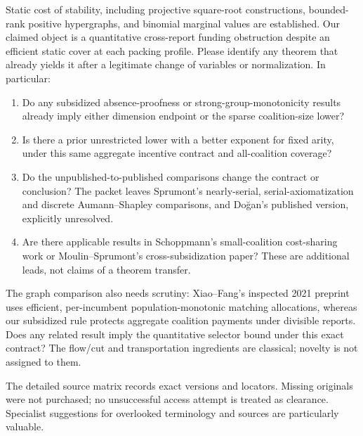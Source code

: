 \documentclass[11pt]{article}
\begin{document}
Static cost of stability, including projective square-root constructions,
bounded-rank positive hypergraphs, and binomial marginal values are established.
Our claimed object is a quantitative cross-report funding obstruction despite
an efficient static cover at each packing profile. Please identify any theorem
that already yields it after a legitimate change of variables or normalization.
In particular:
\begin{enumerate}
\item Do any subsidized absence-proofness or strong-group-monotonicity results
already imply either dimension endpoint or the sparse coalition-size lower?
\item Is there a prior unrestricted lower with a better exponent for fixed
arity, under this same aggregate incentive contract and all-coalition coverage?
\item Do the unpublished-to-published comparisons change the contract or
conclusion? The packet leaves Sprumont's nearly-serial, serial-axiomatization
and discrete Aumann--Shapley comparisons, and Do\u{g}an's published version,
explicitly unresolved.
\item Are there applicable results in Schoppmann's small-coalition cost-sharing
work or Moulin--Sprumont's cross-subsidization paper? These are additional
leads, not claims of a theorem transfer.
\end{enumerate}
The graph comparison also needs scrutiny: Xiao--Fang's inspected 2021 preprint
uses efficient, per-incumbent population-monotonic matching allocations, whereas
our subsidized rule protects aggregate coalition payments under divisible
reports. Does any related result imply the quantitative selector bound under
this exact contract? The flow/cut and transportation ingredients are classical;
novelty is not assigned to them.

The detailed source matrix records exact versions and locators. Missing
originals were not purchased; no unsuccessful access attempt is treated as
clearance. Specialist suggestions for overlooked terminology and sources are
particularly valuable.
\end{document}
